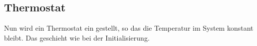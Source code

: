 \subsection*{Thermostat}
Nun wird ein Thermostat ein gestellt, so das die Temperatur im System konstant bleibt.
Das geschieht wie bei der Initialisierung.
\begin{figure}[h!]
	\centering
	\centering
\end{figure}